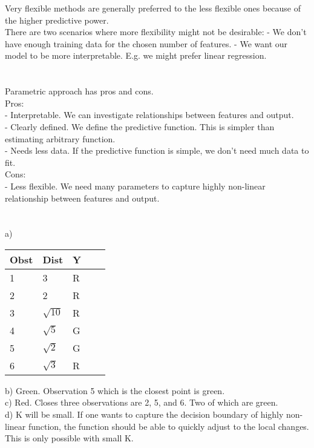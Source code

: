\documentclass{article}
\begin{document}
Very flexible methods are generally preferred to the less flexible ones because of the higher
predictive power. \\

There are two scenarios where more flexibility might not be desirable:
 - We don't have enough training data for the chosen number of features.
 - We want our model to be more interpretable. E.g. we might prefer linear regression.
 
\section{}

Parametric approach has pros and cons. \\

Pros: \\
 - Interpretable. We can investigate relationships between features and output. \\
 - Clearly defined. We define the predictive function. This is simpler than estimating arbitrary function. \\
 - Needs less data. If the predictive function is simple, we don't need much data to fit. \\

Cons: \\
 - Less flexible. We need many parameters to capture highly non-linear relationship between features and output. \\

\section{}

a)

\begin{table}[h]
\begin{tabular}{lllll}
Obst & Dist & Y \\
\hline
1 & 3 & R \\
2 & 2 & R \\
3 & $\sqrt{10}$ & R \\
4 & $\sqrt{5}$ & G \\
5 & $\sqrt{2}$ & G \\
6 & $\sqrt{3}$ & R \\
\end{tabular}
\end{table}

b) Green. Observation 5 which is the closest point is green. \\

c) Red. Closes three observations are 2, 5, and 6. Two of which are green. \\

d) K will be small. If one wants to capture the decision boundary of highly non-linear function, the function should be able to quickly adjust to the local changes. This is only possible with small K. \\
\end{document}

